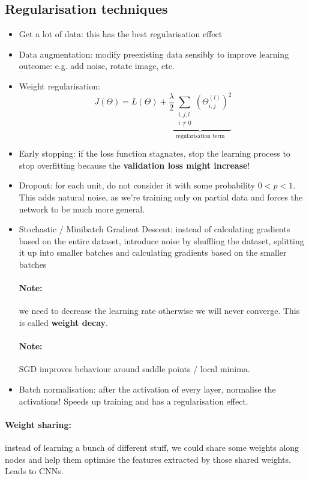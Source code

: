 \documentclass{article}
\renewcommand{\|}{\,\,|\,\,}
\begin{document}
\subsection{Regularisation techniques}
\begin{itemize}
\item Get a lot of data: this has the best regularisation effect
\item Data augmentation: modify preexisting data sensibly to improve learning
  outcome: e.g. add noise, rotate image, etc.
\item Weight regularisation:
  \[
    J(\Theta) = L(\Theta) + \underbrace{\frac{\lambda}{2}\sum_{\substack{i,j,l
          \\ i \neq 0}}
      (\Theta_{i, j}^{(l)})^2}_{\text{regularisation term}}
  \]
\item Early stopping: if the loss function stagnates, stop the learning process
  to stop overfitting because the \textbf{validation loss might increase}!
\item Dropout: for each unit, do not consider it with some probability $0 < p <
  1$. This adds natural noise, as we're training only on partial data and forces
  the network to be much more general.
\item Stochastic / Minibatch Gradient Descent: instead of calculating gradients
  based on the entire dataset, introduce noise by shuffling the dataset,
  splitting it up into smaller batches and calculating gradients based on the
  smaller batches
  \paragraph{Note:} we need to decrease the learning rate otherwise we will
  never converge. This is called \textbf{weight decay}.
  \paragraph{Note:} SGD improves behaviour around saddle points / local minima.
\item Batch normalisation: after the activation of every layer, normalise the
  activations! Speeds up training and has a regularisation effect.
\end{itemize}
\paragraph{Weight sharing:} instead of learning a bunch of different stuff, we
could share some weights along nodes and help them optimise the features
extracted by those shared weights. Leads to CNNs.
\end{document}
